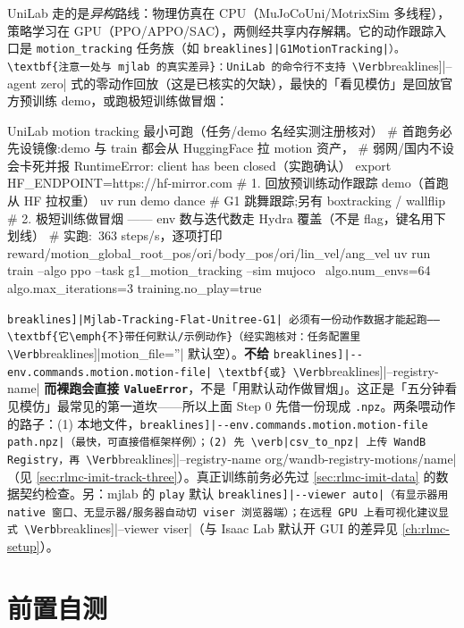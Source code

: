 UniLab 走的是\emph{异构}路线：物理仿真在 CPU（MuJoCoUni/MotrixSim 多线程），策略学习在 GPU（PPO/APPO/SAC），两侧经共享内存解耦。它的动作跟踪入口是 \texttt{motion\_tracking} 任务族（如 \Verb[breaklines]|G1MotionTracking|）。\textbf{注意一处与 mjlab 的真实差异}：UniLab 的命令行不支持 \Verb[breaklines]|--agent zero| 式的零动作回放（这是已核实的欠缺），最快的「看见模仿」是回放官方预训练 demo，或跑极短训练做冒烟：

\begin{codebox}[bash]{UniLab motion tracking 最小可跑（任务/demo 名经实测注册核对）}
# 首跑务必先设镜像:demo 与 train 都会从 HuggingFace 拉 motion 资产，
#   弱网/国内不设会卡死并报 RuntimeError: client has been closed（实跑确认）
export HF_ENDPOINT=https://hf-mirror.com
# 1. 回放预训练动作跟踪 demo（首跑从 HF 拉权重）
uv run demo dance        # G1 跳舞跟踪;另有 boxtracking / wallflip
# 2. 极短训练做冒烟 —— env 数与迭代数走 Hydra 覆盖（不是 flag，键名用下划线）
#    实跑:~363 steps/s，逐项打印 reward/motion_global_root_pos/ori/body_pos/ori/lin_vel/ang_vel
uv run train --algo ppo --task g1_motion_tracking --sim mujoco \
    algo.num_envs=64 algo.max_iterations=3 training.no_play=true
\end{codebox}

\begin{note}
\Verb[breaklines]|Mjlab-Tracking-Flat-Unitree-G1| 必须有一份动作数据才能起跑——\textbf{它\emph{不}带任何默认/示例动作}（经实跑核对：任务配置里 \Verb[breaklines]|motion_file=''| 默认空）。\textbf{不给} \Verb[breaklines]|--env.commands.motion.motion-file| \textbf{或} \Verb[breaklines]|--registry-name| \textbf{而裸跑会直接 \texttt{ValueError}}，不是「用默认动作做冒烟」。这正是「五分钟看见模仿」最常见的第一道坎——所以上面 Step 0 先借一份现成 \verb|.npz|。两条喂动作的路子：(1) 本地文件，\Verb[breaklines]|--env.commands.motion.motion-file path.npz|（最快，可直接借框架样例）；(2) 先 \verb|csv_to_npz| 上传 WandB Registry，再 \Verb[breaklines]|--registry-name org/wandb-registry-motions/name|（见 \cref{sec:rlmc-imit-track-three}）。真正训练前务必先过 \cref{sec:rlmc-imit-data} 的数据契约检查。另：mjlab 的 \verb|play| 默认 \Verb[breaklines]|--viewer auto|（有显示器用 native 窗口、无显示器/服务器自动切 viser 浏览器端）；在远程 GPU 上看可视化建议显式 \Verb[breaklines]|--viewer viser|（与 Isaac Lab 默认开 GUI 的差异见 \cref{ch:rlmc-setup}）。
\end{note}

\section*{前置自测}
\label{sec:rlmc-imit-pretest}

